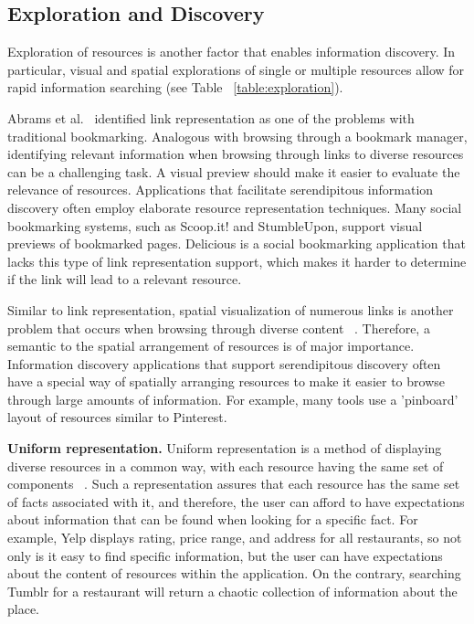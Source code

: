 {{{} %


} %

{\subsection{Exploration and Discovery}
Exploration of resources is another factor that enables information discovery. In particular, visual and spatial explorations of single or multiple resources allow for rapid information searching (see Table ~\ref{table:exploration}). 

Abrams et al.~\cite{abrams} identified link representation as one of the problems with traditional bookmarking. Analogous with browsing through a bookmark manager, identifying relevant information when browsing through links to diverse resources can be a challenging task. A visual preview should make it easier to evaluate the relevance of resources. Applications that facilitate serendipitous information discovery often employ elaborate resource representation techniques. Many social bookmarking systems, such as Scoop.it! and StumbleUpon, support visual previews of bookmarked pages. Delicious is a social bookmarking application that lacks this type of link representation support, which makes it harder to determine if the link will lead to a relevant resource.

Similar to link representation, spatial visualization of numerous links is another problem that occurs when browsing through diverse content ~\cite{abrams}. Therefore, a semantic to the spatial arrangement of resources is of major importance. Information discovery applications that support serendipitous discovery often have a special way of spatially arranging resources to make it easier to browse through large amounts of information. For example, many tools use a 'pinboard' layout of resources similar to Pinterest.

\textbf{Uniform representation.} Uniform representation is a method of displaying diverse resources in a common way, with each resource having the same set of components ~\cite{herrera}. Such a representation assures that each resource has the same set of facts associated with it, and therefore, the user can afford to have expectations about information that can be found when looking for a specific fact. For example, Yelp displays rating, price range, and address for all restaurants, so not only is it easy to find specific information, but the user can have expectations about the content of resources within the application. On the contrary, searching Tumblr for a restaurant will return a chaotic collection of information about the place. 



}}

